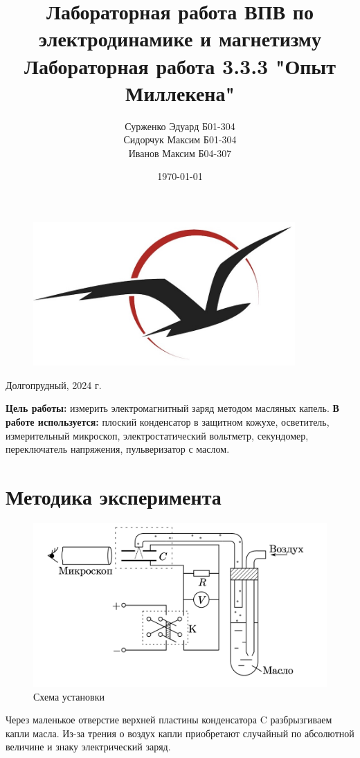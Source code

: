 \documentclass{lab}
\title {Лабораторная работа }
\author {}
\date{\today}
\begin{document}
\begin{titlepage}
    \centering
    \begin{figure}[t]
        \centering
        \includegraphics[width=100mm]{frtk-label 2.jpg}
        \label{frkt-label.jpg}
    \end{figure}

    \author{Сурженко Эдуард Б01-304 \\ Сидорчук Максим Б01-304 \\ Иванов Максим Б04-307}
    \title{ВПВ по электродинамике и магнетизму \\
    Лабораторная работа 3.3.3 "Опыт Миллекена"}
    \date{}
    \maketitle
    \thispagestyle{empty}
    \vfill
    Долгопрудный, 2024 г.

\end{titlepage}
\newpage

\textbf{Цель работы:} измерить электромагнитный заряд методом масляных капель.
\textbf{В работе используется:} плоский конденсатор в защитном кожухе, осветитель, измерительный микроскоп, электростатический вольтметр, секундомер, переключатель напряжения, пульверизатор с маслом.
\section{Методика эксперимента}
\begin{figure}[h!]
    \centering
    \includegraphics[width=0.8\linewidth]{Снимок экрана 2024-12-24 в 19.44.51.png}
    \caption{Схема установки}
    \label{fig:ustan}
\end{figure}
\noindent
Через маленькое отверстие верхней пластины конденсатора C разбрызгиваем капли масла. Из-за трения о воздух капли приобретают случайный по абсолютной величине и знаку электрический заряд.
\end{document}
